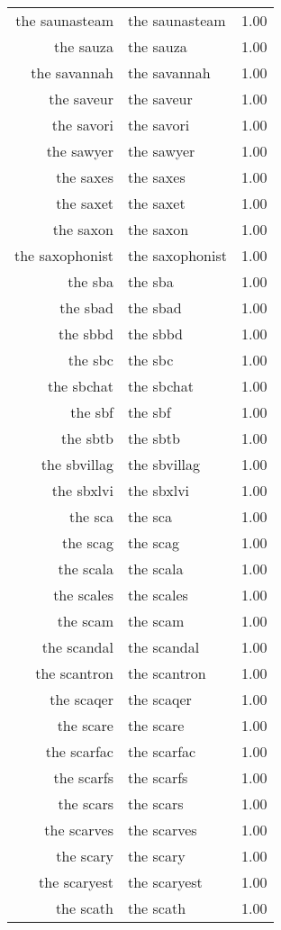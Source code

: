 \begin{table}[ht]
\begin{tabular}{rlr}
  the saunasteam & the saunasteam & 1.00 \\ 
  the sauza & the sauza & 1.00 \\ 
  the savannah & the savannah & 1.00 \\ 
  the saveur & the saveur & 1.00 \\ 
  the savori & the savori & 1.00 \\ 
  the sawyer & the sawyer & 1.00 \\ 
  the saxes & the saxes & 1.00 \\ 
  the saxet & the saxet & 1.00 \\ 
  the saxon & the saxon & 1.00 \\ 
  the saxophonist & the saxophonist & 1.00 \\ 
  the sba & the sba & 1.00 \\ 
  the sbad & the sbad & 1.00 \\ 
  the sbbd & the sbbd & 1.00 \\ 
  the sbc & the sbc & 1.00 \\ 
  the sbchat & the sbchat & 1.00 \\ 
  the sbf & the sbf & 1.00 \\ 
  the sbtb & the sbtb & 1.00 \\ 
  the sbvillag & the sbvillag & 1.00 \\ 
  the sbxlvi & the sbxlvi & 1.00 \\ 
  the sca & the sca & 1.00 \\ 
  the scag & the scag & 1.00 \\ 
  the scala & the scala & 1.00 \\ 
  the scales & the scales & 1.00 \\ 
  the scam & the scam & 1.00 \\ 
  the scandal & the scandal & 1.00 \\ 
  the scantron & the scantron & 1.00 \\ 
  the scaqer & the scaqer & 1.00 \\ 
  the scare & the scare & 1.00 \\ 
  the scarfac & the scarfac & 1.00 \\ 
  the scarfs & the scarfs & 1.00 \\ 
  the scars & the scars & 1.00 \\ 
  the scarves & the scarves & 1.00 \\ 
  the scary & the scary & 1.00 \\ 
  the scaryest & the scaryest & 1.00 \\ 
  the scath & the scath & 1.00 \\ 

\end{tabular}
\end{table}
